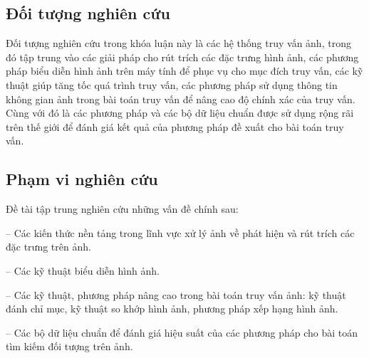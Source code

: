 \subsection{Đối tượng nghiên cứu}
Đối tượng nghiên cứu trong khóa luận này là các hệ thống truy vấn ảnh, trong đó tập trung vào các giải pháp cho rút trích các đặc trưng hình ảnh, các phương pháp biểu diễn hình ảnh trên máy tính để phục vụ cho mục đích truy vấn, các kỹ thuật giúp tăng tốc quá trình truy vấn, các phương pháp sử dụng thông tin không gian ảnh trong bài toán truy vấn để nâng cao độ chính xác của truy vấn. Cùng với đó là các phương pháp và các bộ dữ liệu chuẩn được sử dụng rộng rãi trên thế giới để đánh giá kết quả của phương pháp đề xuất cho bài toán truy vấn.

\subsection{Phạm vi nghiên cứu}
Đề tài tập trung nghiên cứu những vấn đề chính sau:

-- Các kiến thức nền tảng trong lĩnh vực xử lý ảnh về phát hiện và rút trích các đặc trưng trên ảnh.

-- Các kỹ thuật biểu diễn hình ảnh.

-- Các kỹ thuật, phương pháp nâng cao trong bài toán truy vấn ảnh: kỹ thuật đánh chỉ mục, kỹ thuật so khớp hình ảnh, phương pháp xếp hạng hình ảnh.

-- Các bộ dữ liệu chuẩn để đánh giá hiệu suất của các phương pháp cho bài toán tìm kiếm đối tượng trên ảnh. 


